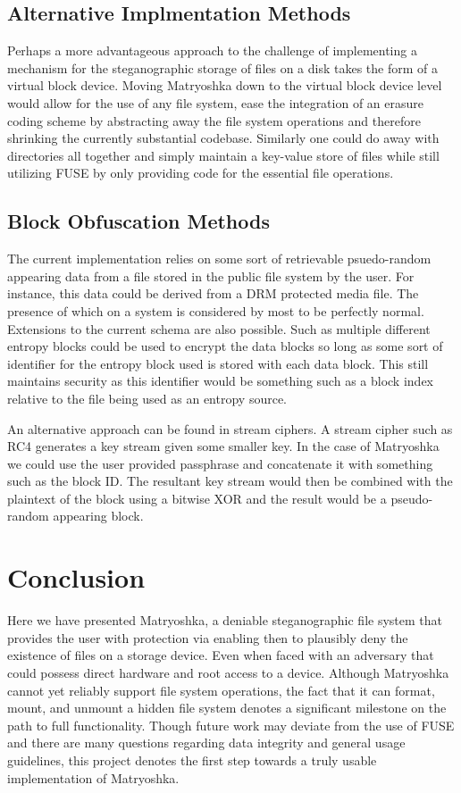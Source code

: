\documentclass{article}
\begin{document}
\begin{multicols}{2}
\subsection{Alternative Implmentation Methods}
Perhaps a more advantageous approach to the challenge of implementing a mechanism for the steganographic storage of files on a disk takes the form of a virtual block device. Moving Matryoshka down to the virtual block device level would allow for the use of any file system, ease the integration of an erasure coding scheme by abstracting away the file system operations and therefore shrinking the currently substantial codebase. Similarly one could do away with directories all together and simply maintain a key-value store of files while still utilizing FUSE by only providing code for the essential file operations.

\subsection{Block Obfuscation Methods}

The current implementation relies on some sort of retrievable psuedo-random appearing data from a file stored in the public file system by the user. For instance, this data could be derived from a DRM protected media file. The presence of which on a system is considered by most to be perfectly normal. Extensions to the current schema are also possible. Such as multiple different entropy blocks could be used to encrypt the data blocks so long as some sort of identifier for the entropy block used is stored with each data block. This still maintains security as this identifier would be something such as a block index relative to the file being used as an entropy source.

An alternative approach can be found in stream ciphers. A stream cipher such as RC4 generates a key stream given some smaller key. In the case of Matryoshka we  could use the user provided passphrase and concatenate it with something such as the block ID. The resultant key stream would then be combined with the plaintext of the block using a bitwise XOR and the result would be a pseudo-random appearing block. 

\section{Conclusion}

Here we have presented Matryoshka, a deniable steganographic file system that provides the user with protection via enabling then to plausibly deny the existence of files on a storage device. Even when faced with an adversary that could possess direct hardware and root access to a device. Although Matryoshka cannot yet reliably support file system operations, the fact that it can format, mount, and unmount a hidden file system denotes a significant milestone on the path to full functionality. Though future work may deviate from the use of FUSE and there are many questions regarding data integrity and general usage guidelines, this project denotes the first step towards a truly usable implementation of Matryoshka.
 

\end{multicols}
\end{document}

